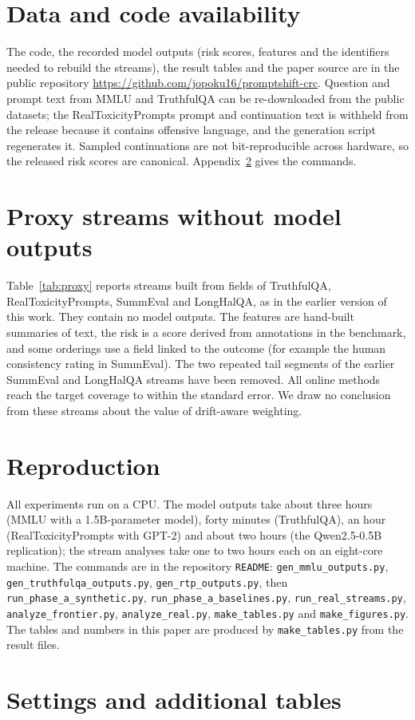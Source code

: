 \documentclass[11pt]{article}
\begin{document}
\section*{Data and code availability}
The code, the recorded model outputs (risk scores, features and the identifiers needed to rebuild the streams), the result tables and the paper source are in the public repository \url{https://github.com/jopoku16/promptshift-crc}. Question and prompt text from MMLU and TruthfulQA can be re-downloaded from the public datasets; the RealToxicityPrompts prompt and continuation text is withheld from the release because it contains offensive language, and the generation script regenerates it. Sampled continuations are not bit-reproducible across hardware, so the released risk scores are canonical. Appendix~\ref{app:repro} gives the commands.




\appendix


\section{Proxy streams without model outputs}\label{app:proxy}
Table~\ref{tab:proxy} reports streams built from fields of TruthfulQA, RealToxicityPrompts, SummEval and LongHalQA, as in the earlier version of this work. They contain no model outputs. The features are hand-built summaries of text, the risk is a score derived from annotations in the benchmark, and some orderings use a field linked to the outcome (for example the human consistency rating in SummEval). The two repeated tail segments of the earlier SummEval and LongHalQA streams have been removed. All online methods reach the target coverage to within the standard error. We draw no conclusion from these streams about the value of drift-aware weighting.

\section{Reproduction}\label{app:repro}
All experiments run on a CPU. The model outputs take about three hours (MMLU with a 1.5B-parameter model), forty minutes (TruthfulQA), an hour (RealToxicityPrompts with GPT-2) and about two hours (the Qwen2.5-0.5B replication); the stream analyses take one to two hours each on an eight-core machine. The commands are in the repository \texttt{README}: \texttt{gen\_mmlu\_outputs.py}, \texttt{gen\_truthfulqa\_outputs.py}, \texttt{gen\_rtp\_outputs.py}, then \texttt{run\_phase\_a\_synthetic.py}, \texttt{run\_phase\_a\_baselines.py}, \texttt{run\_real\_streams.py}, \texttt{analyze\_frontier.py}, \texttt{analyze\_real.py}, \texttt{make\_tables.py} and \texttt{make\_figures.py}. The tables and numbers in this paper are produced by \texttt{make\_tables.py} from the result files.

\section{Settings and additional tables}\label{app:hyper}

\end{document}

